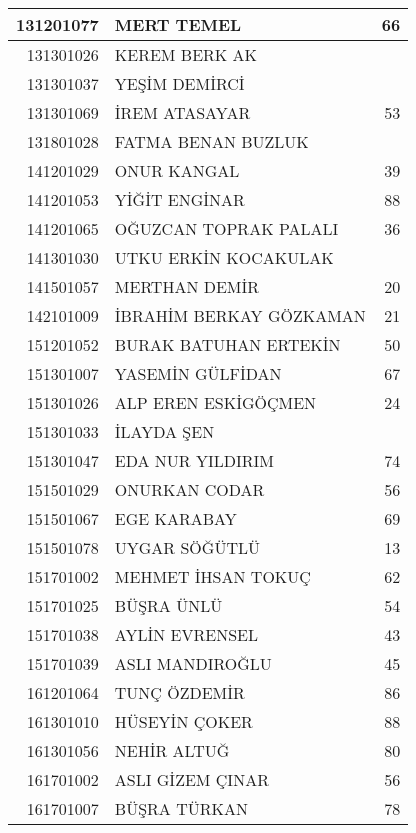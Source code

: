 \documentclass[12pt]{article}
\begin{document}
\begin{multicols}{2}
\begin{longtable}{||r||l||r||}
    \midrule
    131201077 & MERT TEMEL & 66 \\
    \midrule
    131301026 & KEREM BERK AK &  \\
    \midrule
    131301037 & YEŞİM DEMİRCİ &  \\
    \midrule
    131301069 & İREM ATASAYAR & 53 \\
    \midrule
    131801028 & FATMA BENAN BUZLUK &  \\
    \midrule
    141201029 & ONUR KANGAL & \cellcolor[rgb]{ 1,  1,  0} 39 \\
    \midrule
    141201053 & YİĞİT ENGİNAR & 88 \\
    \midrule
    141201065 & OĞUZCAN TOPRAK PALALI & 36 \\
    \midrule
    141301030 & UTKU ERKİN KOCAKULAK &  \\
    \midrule
    141501057 & MERTHAN DEMİR & 20 \\
    \midrule
    142101009 & İBRAHİM BERKAY GÖZKAMAN & 21 \\
    \midrule
    151201052 & BURAK BATUHAN ERTEKİN & 50 \\
    \midrule
    151301007 & YASEMİN GÜLFİDAN & 67 \\
    \midrule
    151301026 & ALP EREN ESKİGÖÇMEN & 24 \\
    \midrule
    151301033 & İLAYDA ŞEN &  \\
    \midrule
    151301047 & EDA NUR YILDIRIM & \cellcolor[rgb]{ 1,  1,  0} 74 \\
    \midrule
    151501029 & ONURKAN CODAR & 56 \\
    \midrule
    151501067 & EGE KARABAY & 69 \\
    \midrule
    151501078 & UYGAR SÖĞÜTLÜ & 13 \\
    \midrule
    151701002 & MEHMET İHSAN TOKUÇ & 62 \\
    \midrule
    151701025 & BÜŞRA ÜNLÜ & 54 \\
    \midrule
    151701038 & AYLİN EVRENSEL & 43 \\
    \midrule
    151701039 & ASLI MANDIROĞLU & \cellcolor[rgb]{ 1,  1,  0} 45 \\
    \midrule
    161201064 & TUNÇ ÖZDEMİR & 86 \\
    \midrule
    161301010 & HÜSEYİN ÇOKER & 88 \\
    \midrule
    161301056 & NEHİR ALTUĞ & 80 \\
    \midrule
    161701002 & ASLI GİZEM ÇINAR & 56 \\
    \midrule
    161701007 & BÜŞRA TÜRKAN & 78 \\

\end{longtable}
\end{multicols}
\end{document}
